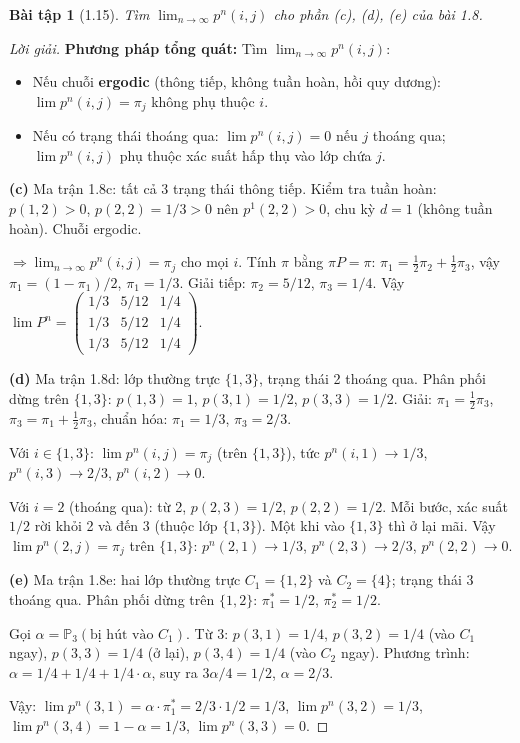 \documentclass[8pt,a4paper]{article}
\newtheorem{exercise}{Bài tập}
\newenvironment{solution}{\begin{proof}[Lời giải]}{\end{proof}}
\newcommand{\prob}{\mathbb{P}}
\begin{document}
\begin{exercise}[1.15]
Tìm $\lim_{n\to\infty} p^n(i,j)$ cho phần (c), (d), (e) của bài 1.8.
\end{exercise}
\begin{solution}
\textbf{Phương pháp tổng quát:} Tìm $\lim_{n\to\infty} p^n(i,j)$:
\begin{itemize}
  \item Nếu chuỗi \textbf{ergodic} (thông tiếp, không tuần hoàn, hồi quy dương): $\lim p^n(i,j) = \pi_j$ không phụ thuộc $i$.
  \item Nếu có trạng thái thoáng qua: $\lim p^n(i,j) = 0$ nếu $j$ thoáng qua; $\lim p^n(i,j)$ phụ thuộc xác suất hấp thụ vào lớp chứa $j$.
\end{itemize}

\textbf{(c)} Ma trận 1.8c: tất cả 3 trạng thái thông tiếp. Kiểm tra tuần hoàn: $p(1,2) > 0$, $p(2,2) = 1/3 > 0$ nên $p^1(2,2)>0$, chu kỳ $d=1$ (không tuần hoàn). Chuỗi ergodic.

$\Rightarrow \lim_{n\to\infty} p^n(i,j) = \pi_j$ cho mọi $i$. Tính $\pi$ bằng $\pi P = \pi$:
$\pi_1 = \frac{1}{2}\pi_2 + \frac{1}{2}\pi_3$, vậy $\pi_1 = (1-\pi_1)/2$, $\pi_1 = 1/3$.
Giải tiếp: $\pi_2 = 5/12$, $\pi_3 = 1/4$. Vậy $\lim P^n = \begin{pmatrix} 1/3 & 5/12 & 1/4 \\ 1/3 & 5/12 & 1/4 \\ 1/3 & 5/12 & 1/4 \end{pmatrix}$.

\textbf{(d)} Ma trận 1.8d: lớp thường trực $\{1,3\}$, trạng thái 2 thoáng qua. Phân phối dừng trên $\{1,3\}$: $p(1,3)=1$, $p(3,1)=1/2$, $p(3,3)=1/2$. Giải: $\pi_1 = \frac{1}{2}\pi_3$, $\pi_3 = \pi_1 + \frac{1}{2}\pi_3$, chuẩn hóa: $\pi_1 = 1/3$, $\pi_3 = 2/3$.

Với $i \in \{1,3\}$: $\lim p^n(i,j) = \pi_j$ (trên $\{1,3\}$), tức $p^n(i,1)\to 1/3$, $p^n(i,3)\to 2/3$, $p^n(i,2)\to 0$.

Với $i=2$ (thoáng qua): từ 2, $p(2,3)=1/2$, $p(2,2)=1/2$. Mỗi bước, xác suất $1/2$ rời khỏi 2 và đến 3 (thuộc lớp $\{1,3\}$). Một khi vào $\{1,3\}$ thì ở lại mãi. Vậy $\lim p^n(2,j) = \pi_j$ trên $\{1,3\}$: $p^n(2,1)\to 1/3$, $p^n(2,3)\to 2/3$, $p^n(2,2)\to 0$.

\textbf{(e)} Ma trận 1.8e: hai lớp thường trực $C_1=\{1,2\}$ và $C_2=\{4\}$; trạng thái 3 thoáng qua. Phân phối dừng trên $\{1,2\}$: $\pi_1^* = 1/2$, $\pi_2^* = 1/2$.

Gọi $\alpha = \prob_3(\text{bị hút vào } C_1)$. Từ 3: $p(3,1)=1/4$, $p(3,2)=1/4$ (vào $C_1$ ngay), $p(3,3)=1/4$ (ở lại), $p(3,4)=1/4$ (vào $C_2$ ngay). Phương trình: $\alpha = 1/4 + 1/4 + 1/4 \cdot \alpha$, suy ra $3\alpha/4 = 1/2$, $\alpha = 2/3$.

Vậy: $\lim p^n(3,1) = \alpha \cdot \pi_1^* = 2/3 \cdot 1/2 = 1/3$, $\lim p^n(3,2) = 1/3$, $\lim p^n(3,4) = 1-\alpha = 1/3$, $\lim p^n(3,3) = 0$.
\end{solution}
\end{document}
